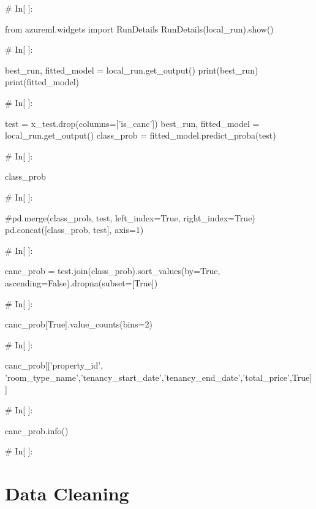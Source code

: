 \begin{python}
# In[ ]:


from azureml.widgets import RunDetails
RunDetails(local_run).show()


# In[ ]:


best_run, fitted_model = local_run.get_output()
print(best_run)
print(fitted_model)


# In[ ]:


test = x_test.drop(columns=['is_canc'])
best_run, fitted_model = local_run.get_output()
class_prob = fitted_model.predict_proba(test)


# In[ ]:


class_prob


# In[ ]:


#pd.merge(class_prob, test, left_index=True, right_index=True)
pd.concat([class_prob, test], axis=1)


# In[ ]:


canc_prob = test.join(class_prob).sort_values(by=True, ascending=False).dropna(subset=[True])


# In[ ]:


canc_prob[True].value_counts(bins=2)


# In[ ]:


canc_prob[['property_id', 'room_type_name','tenancy_start_date','tenancy_end_date','total_price',True]]


# In[ ]:


canc_prob.info()


# In[ ]:
\end{python}

\section{Data Cleaning}

